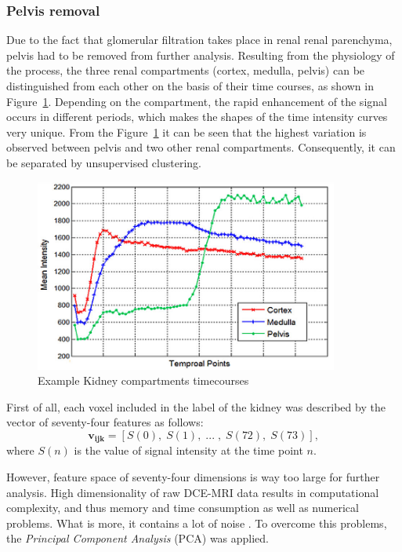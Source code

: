 \subsubsection{Pelvis removal}
Due to the fact that glomerular filtration takes place in renal renal parenchyma, pelvis had to be removed from further analysis. 
\newpage
Resulting from the physiology of the process, the three renal compartments (cortex, medulla, pelvis) can be distinguished from each other on the basis of their time courses, as shown in Figure~\ref{fig:timecourses}. Depending on the compartment, the rapid enhancement of the signal occurs in different periods, which makes the shapes of the time intensity curves very unique.
From the Figure~\ref{fig:timecourses} it can be seen that the highest variation is observed between pelvis and two other renal compartments.
Consequently, it can be separated by unsupervised clustering.
\vspace{0.5cm}

\begin{figure}[H]
	\centering
	\includegraphics[width=10cm]{img/timecourses}
	\caption[Example kidney compartments timecourses]{Example Kidney compartments timecourses \cite{KidneySubsegmentation}}
	\label{fig:timecourses}
\end{figure}

First of all, each voxel included in the label of the kidney was described by the vector of seventy-four features as follows:
\begin{equation}
\label{eq:voxel}
\mathbf{v_{ijk}} = [S(0),\; S(1),\;...\;,\; S(72),\; S(73)],
\end{equation}
where $S(n)$ is the value of signal intensity at the time point $n$.

However, feature space of seventy-four dimensions is way too large for further analysis. High dimensionality of raw DCE-MRI data results in computational complexity, and thus memory and time consumption as well as numerical problems. What is more, it contains a lot of noise \cite{KidneySubsegmentation}. To overcome this problems, the \textit{Principal Component Analysis} (PCA) \cite{pca} was applied.

